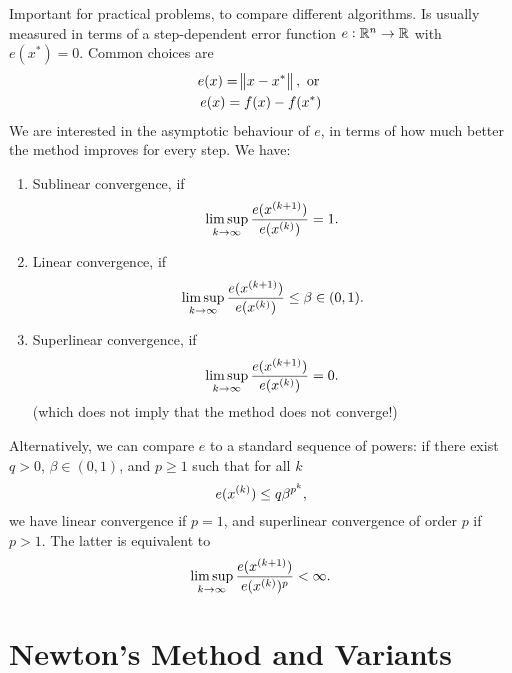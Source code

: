 \documentclass{article}
\begin{document}
Important for practical problems, to compare different algorithms.  Is usually measured in terms of
a step-dependent error function \(e: \RR^n \to \RR\) with \(e(x^*) = 0\).  Common choices are
\begin{gather*}
  e(x) = \enVert[1]{x - x^*}, \text{ or } \\
  e(x) = f(x) - f(x^*)
\end{gather*}
We are interested in the asymptotic behaviour of \(e\), in terms of how much better the method
improves for every step.  We have:
\begin{enumerate}
\item Sublinear convergence, if
  \begin{equation*}
    \limsup_{k \to \infty} \frac{e(\kth[k+1]{x})}{e(\kth{x})} = 1.
  \end{equation*}
\item Linear convergence, if
  \begin{equation*}
    \limsup_{k \to \infty}
    \frac{e(\kth[k+1]{x})}{e(\kth{x})} \leq \beta \in (0, 1).
  \end{equation*}
\item Superlinear convergence, if
  \begin{equation*}
    \limsup_{k \to \infty} \frac{e(\kth[k+1]{x})}{e(\kth{x})} = 0.
  \end{equation*}
  (which does not imply that the method does not converge!)
\end{enumerate}
Alternatively, we can compare \(e\) to a standard sequence of powers: if there exist \(q > 0\),
\(\beta \in (0, 1)\), and \(p \geq 1\) such that for all \(k\)
\begin{equation*}
  e(\kth{x}) \leq q \beta^{p^k},
\end{equation*}
we have linear convergence if \(p = 1\), and superlinear convergence of order \(p\) if \(p > 1\).
The latter is equivalent to
\begin{equation*}
  \limsup_{k \to \infty} \frac{e(\kth[k+1]{x})}{e(\kth{x})^p} < \infty.
\end{equation*}


\section{Newton's Method and Variants}

\end{document}

